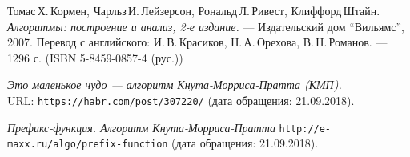 \begin{thebibliography}{99}
Томас\,Х.\,Кормен, Чарльз\,И.\,Лейзерсон, Рональд\,Л.\,Ривест, Клиффорд\,Штайн.
{\itshape Алгоритмы: построение и анализ, 2-е издание.} --- Издательский дом \enquote{Вильямс}, 2007. Перевод с английского: И.\,В.\,Красиков, Н.\,А.\,Орехова, В.\,Н.\,Романов. --- 1296 с. (ISBN 5-8459-0857-4 (рус.))

{\itshape Это маленькое чудо — алгоритм Кнута-Морриса-Пратта (КМП).} \\URL: \texttt{https://habr.com/post/307220/} (дата обращения: 21.09.2018).
 
{\itshape Префикс-функция. Алгоритм Кнута-Морриса-Пратта}
\texttt{http://e-maxx.ru/algo/prefix-function} (дата обращения: 21.09.2018).
\end{thebibliography}
\pagebreak

